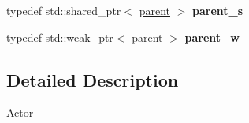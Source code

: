 \begin{DoxyCompactItemize}
\item 
\hypertarget{namespaceglutpp_1_1actor_a10162031546b1b741f13beb7b1020796}{typedef std\-::shared\-\_\-ptr$<$ \hyperlink{classglutpp_1_1actor_1_1parent}{parent} $>$ {\bfseries parent\-\_\-s}}\label{namespaceglutpp_1_1actor_a10162031546b1b741f13beb7b1020796}

\item 
\hypertarget{namespaceglutpp_1_1actor_a4f223a7a23d399597f65cc34f95845aa}{typedef std\-::weak\-\_\-ptr$<$ \hyperlink{classglutpp_1_1actor_1_1parent}{parent} $>$ {\bfseries parent\-\_\-w}}\label{namespaceglutpp_1_1actor_a4f223a7a23d399597f65cc34f95845aa}

\end{DoxyCompactItemize}


\subsection{\-Detailed \-Description}
\-Actor 